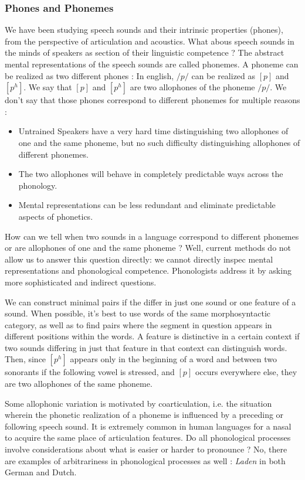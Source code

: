 \documentclass{cours}
\begin{document}
\subsubsection{Phones and Phonemes}
We have been studying speech sounds and their intrinsic properties (phones), from the perspective of articulation and acoustics. What abous speech sounds in the minds of speakers as section of their linguistic competence ? The abstract mental representations of the speech sounds are called phonemes.
A phoneme can be realized as two different phones\! : In english, $/p/$ can be realized as $[p]$ and $[p^{h}]$. We say that $[p]$ and $[p^{h}]$ are two allophones of the phoneme $/p/$.
We don't say that those phones correspond to different phonemes for multiple reasons\! :
\begin{itemize}
    \item Untrained Speakers have a very hard time distinguishing two allophones of one and the same phoneme, but no such difficulty distinguishing allophones of different phonemes.
    \item The two allophones will behave in completely predictable ways across the phonology.
    \item Mental representations can be less redundant and eliminate predictable aspects of phonetics.
\end{itemize}
How can we tell when two sounds in a language correspond to different phonemes or are allophones of one and the same phoneme ? Well, current methods do not allow us to answer this question directly\!: we cannot directly inspec mental representations and phonological competence. Phonologists address it by asking more sophisticated and indirect questions.

We can construct minimal pairs if the differ in just one sound or one feature of a sound. When possible, it's best to use words of the same morphosyntactic category, as well as to find pairs where the segment in question appears in different positions within the words. A feature is distinctive in a certain context if two sounds differing in just that feature in that context can distinguish words.
Then, since $[p^{h}]$ appears only in the beginning of a word and between two sonorants if the following vowel is stressed, and $[p]$ occurs everywhere else, they are two allophones of the same phoneme.

Some allophonic variation is motivated by coarticulation, i.e. the situation wherein the phonetic realization of a phoneme is influenced by a preceding or following speech sound.
It is extremely common in human languages for a nasal to acquire the same place of articulation features. Do all phonological processes involve considerations about what is easier or harder to pronounce ? No, there are examples of arbitrariness in phonological processes as well\! : \textsl{Laden} in both German and Dutch.
\end{document}

